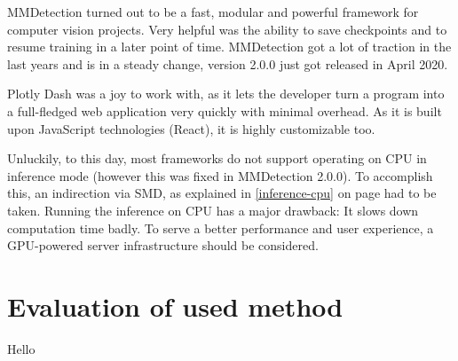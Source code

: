 MMDetection turned out to be a fast, modular and powerful framework for computer vision projects. Very helpful was the ability to save checkpoints and to resume training in a later point of time. MMDetection got a lot of traction in the last years and is in a steady change, version 2.0.0 just got released in April 2020.

Plotly Dash was a joy to work with, as it lets the developer turn a program into a full-fledged web application very quickly with minimal overhead. As it is built upon JavaScript technologies (React), it is highly customizable too.

Unluckily, to this day, most frameworks do not support operating on CPU in inference mode (however this was fixed in MMDetection 2.0.0). To accomplish this, an indirection via SMD, as explained in \ref{inference-cpu} on page \pageref{inference-cpu} had to be taken. Running the inference on CPU has a major drawback: It slows down computation time badly. To serve a better performance and user experience, a GPU-powered server infrastructure should be considered.

\section{Evaluation of used method}

Hello
